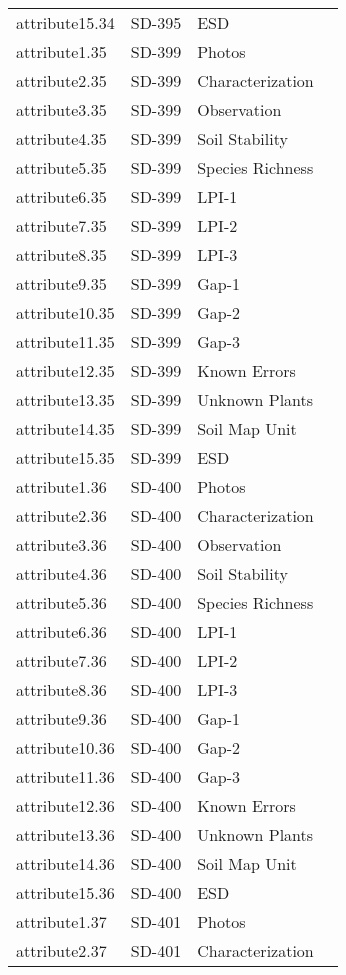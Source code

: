 \documentclass[
]{article}
\begin{document}
\begin{longtable}[]{@{}llll@{}}
attribute15.34 & SD-395 & ESD & \\
attribute1.35 & SD-399 & Photos & \\
attribute2.35 & SD-399 & Characterization & \\
attribute3.35 & SD-399 & Observation & \\
attribute4.35 & SD-399 & Soil Stability & \\
attribute5.35 & SD-399 & Species Richness & \\
attribute6.35 & SD-399 & LPI-1 & \\
attribute7.35 & SD-399 & LPI-2 & \\
attribute8.35 & SD-399 & LPI-3 & \\
attribute9.35 & SD-399 & Gap-1 & \\
attribute10.35 & SD-399 & Gap-2 & \\
attribute11.35 & SD-399 & Gap-3 & \\
attribute12.35 & SD-399 & Known Errors & \\
attribute13.35 & SD-399 & Unknown Plants & \\
attribute14.35 & SD-399 & Soil Map Unit & \\
attribute15.35 & SD-399 & ESD & \\
attribute1.36 & SD-400 & Photos & \\
attribute2.36 & SD-400 & Characterization & \\
attribute3.36 & SD-400 & Observation & \\
attribute4.36 & SD-400 & Soil Stability & \\
attribute5.36 & SD-400 & Species Richness & \\
attribute6.36 & SD-400 & LPI-1 & \\
attribute7.36 & SD-400 & LPI-2 & \\
attribute8.36 & SD-400 & LPI-3 & \\
attribute9.36 & SD-400 & Gap-1 & \\
attribute10.36 & SD-400 & Gap-2 & \\
attribute11.36 & SD-400 & Gap-3 & \\
attribute12.36 & SD-400 & Known Errors & \\
attribute13.36 & SD-400 & Unknown Plants & \\
attribute14.36 & SD-400 & Soil Map Unit & \\
attribute15.36 & SD-400 & ESD & \\
attribute1.37 & SD-401 & Photos & \\
attribute2.37 & SD-401 & Characterization & \\

\end{longtable}
\end{document}
